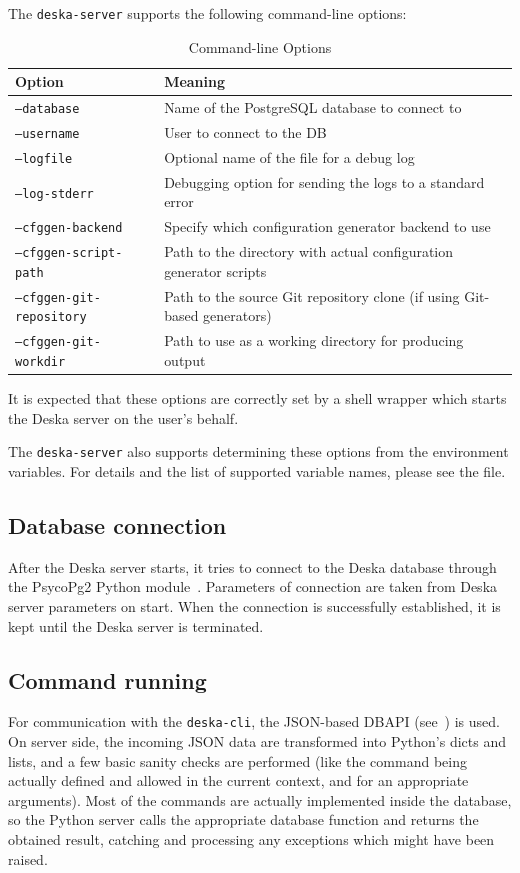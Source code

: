\documentclass[deska]{subfiles}
\begin{document}
The {\tt deska-server} supports the following command-line options:

\begin{longtable}{ l | l }
    \caption{Command-line Options} \\
    Option & Meaning \\
    \hline
    \endhead
    {\tt --database} & Name of the PostgreSQL database to connect to \\
    {\tt --username} & User to connect to the DB \\
    {\tt --logfile} & Optional name of the file for a debug log \\
    {\tt --log-stderr} & Debugging option for sending the logs to a standard error \\
    {\tt --cfggen-backend} & Specify which configuration generator backend to use \\
    {\tt --cfggen-script-path} & Path to the directory with actual configuration generator scripts \\
    {\tt --cfggen-git-repository} & Path to the source Git repository clone (if using Git-based generators) \\
    {\tt --cfggen-git-workdir} & Path to use as a working directory for producing output \\
\end{longtable}

It is expected that these options are correctly set by a shell wrapper which starts the Deska server on the user's
behalf.

The {\tt deska-server} also supports determining these options from the environment variables.  For details and the list
of supported variable names, please see the  file.

\subsection{Database connection}
After the Deska server starts, it tries to connect to the Deska database through the PsycoPg2 Python
module~\cite{psycopg2}.  Parameters of connection are taken from Deska server parameters on start.  When the connection
is successfully established, it is kept until the Deska server is terminated.

\subsection{Command running}
For communication with the {\tt deska-cli}, the JSON-based DBAPI (see~) is used. On server
side, the incoming JSON data are transformed into Python's dicts and lists, and a few basic sanity checks are performed
(like the command being actually defined and allowed in the current context, and for an appropriate arguments).  Most of
the commands are actually implemented inside the database, so the Python server calls the appropriate database function
and returns the obtained result, catching and processing any exceptions which might have been raised.
\end{document}
